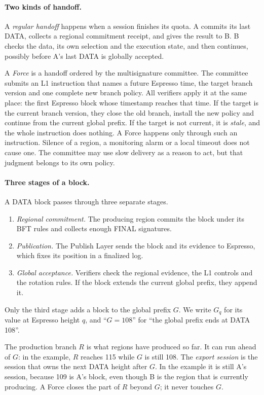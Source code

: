 \documentclass[11pt,a4paper]{article}
\newcommand{\defterm}[1]{\textcolor{rrBlue}{\textit{#1}}}
\begin{document}
\paragraph{Two kinds of handoff.}
A \defterm{regular handoff} happens when a session finishes its quota.
A commits its last DATA, collects a regional commitment receipt, and
gives the result to B. B checks the data, its own selection and the
execution state, and then continues, possibly before A's last
DATA is globally accepted.

A \defterm{Force} is a handoff ordered by the multisignature committee.
The committee submits an L1 instruction that names a future Espresso
time, the target branch version and one complete new branch policy. All
verifiers apply it at the same place: the first Espresso block whose
timestamp reaches that time. If the target is the current branch
version, they close the old branch, install the new policy and continue
from the current global prefix. If the target is not current, it is
\emph{stale}, and the whole instruction does nothing. A Force happens
only through such an instruction. Silence of a region, a monitoring
alarm or a local timeout does not cause one. The committee may use slow
delivery as a reason to act, but that judgment belongs to its own
policy.

\paragraph{Three stages of a block.}
A DATA block passes through three separate stages.
\begin{enumerate}
\item \emph{Regional commitment.} The producing region commits the block
under its BFT rules and collects enough FINAL signatures.
\item \emph{Publication.} The Publish Layer sends the block and its
evidence to Espresso, which fixes its position in a finalized log.
\item \emph{Global acceptance.} Verifiers check the regional evidence,
the L1 controls and the rotation rules. If the block extends the
current global prefix, they append it.
\end{enumerate}
Only the third stage adds a block to the global prefix $G$.
We write $G_q$ for its value at Espresso height $q$, and ``$G=108$'' for
``the global prefix ends at DATA 108''.

The production branch $R$ is what regions have produced so
far. It can run ahead of $G$: in the example, $R$ reaches 115 while
$G$ is still 108. The \defterm{export session} is the session that owns
the next DATA height after $G$. In the example it is still A's
session, because 109 is A's block, even though B is the region that is
currently producing. A Force closes the part of $R$ beyond $G$; it
never touches $G$.
\end{document}
